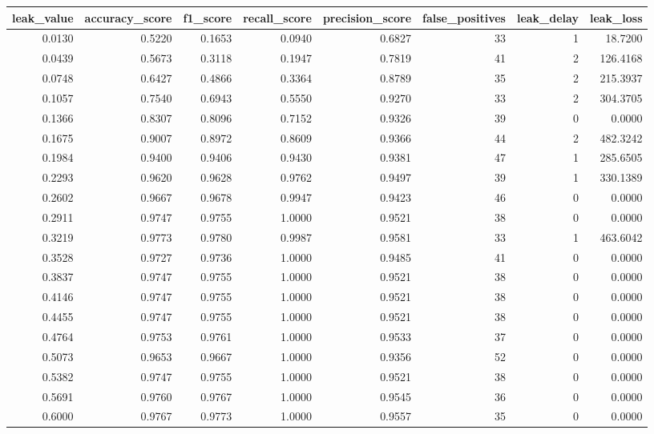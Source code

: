 \begin{tabular}{rrrrrrrr}
\toprule
leak\_value & accuracy\_score & f1\_score & recall\_score & precision\_score & false\_positives & leak\_delay & leak\_loss \\
\midrule
0.0130 & 0.5220 & 0.1653 & 0.0940 & 0.6827 & 33 & 1 & 18.7200 \\
0.0439 & 0.5673 & 0.3118 & 0.1947 & 0.7819 & 41 & 2 & 126.4168 \\
0.0748 & 0.6427 & 0.4866 & 0.3364 & 0.8789 & 35 & 2 & 215.3937 \\
0.1057 & 0.7540 & 0.6943 & 0.5550 & 0.9270 & 33 & 2 & 304.3705 \\
0.1366 & 0.8307 & 0.8096 & 0.7152 & 0.9326 & 39 & 0 & 0.0000 \\
0.1675 & 0.9007 & 0.8972 & 0.8609 & 0.9366 & 44 & 2 & 482.3242 \\
0.1984 & 0.9400 & 0.9406 & 0.9430 & 0.9381 & 47 & 1 & 285.6505 \\
0.2293 & 0.9620 & 0.9628 & 0.9762 & 0.9497 & 39 & 1 & 330.1389 \\
0.2602 & 0.9667 & 0.9678 & 0.9947 & 0.9423 & 46 & 0 & 0.0000 \\
0.2911 & 0.9747 & 0.9755 & 1.0000 & 0.9521 & 38 & 0 & 0.0000 \\
0.3219 & 0.9773 & 0.9780 & 0.9987 & 0.9581 & 33 & 1 & 463.6042 \\
0.3528 & 0.9727 & 0.9736 & 1.0000 & 0.9485 & 41 & 0 & 0.0000 \\
0.3837 & 0.9747 & 0.9755 & 1.0000 & 0.9521 & 38 & 0 & 0.0000 \\
0.4146 & 0.9747 & 0.9755 & 1.0000 & 0.9521 & 38 & 0 & 0.0000 \\
0.4455 & 0.9747 & 0.9755 & 1.0000 & 0.9521 & 38 & 0 & 0.0000 \\
0.4764 & 0.9753 & 0.9761 & 1.0000 & 0.9533 & 37 & 0 & 0.0000 \\
0.5073 & 0.9653 & 0.9667 & 1.0000 & 0.9356 & 52 & 0 & 0.0000 \\
0.5382 & 0.9747 & 0.9755 & 1.0000 & 0.9521 & 38 & 0 & 0.0000 \\
0.5691 & 0.9760 & 0.9767 & 1.0000 & 0.9545 & 36 & 0 & 0.0000 \\
0.6000 & 0.9767 & 0.9773 & 1.0000 & 0.9557 & 35 & 0 & 0.0000 \\
\bottomrule
\end{tabular}
